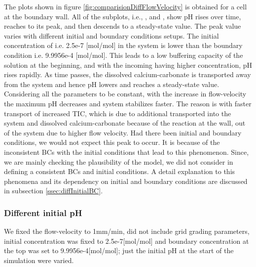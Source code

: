 The plots shown in figure \ref{fig:comparisionDiffFlowVelocity} is obtained for a cell at the boundary wall. 
All of the subplots, i.e., ,  and , 
show pH rises over time, reaches to its peak, and then descends to a steady-state value. The peak value 
varies with different initial and boundary conditions setups. 
The initial concentration of  i.e. 2.5e-7 [mol/mol] in the system is lower than the 
boundary condition i.e. 9.9956e-4 [mol/mol]. This leads to a low buffering capacity of the solution at the 
beginning, and with the incoming  having higher concentration, pH rises rapidly. As time passes, 
the dissolved calcium-carbonate is transported away from the system and hence pH lowers and reaches a steady-state value.\\
Considering all the parameters to be constant, with the increase in flow-velocity the maximum pH decreases and system stabilizes faster. 
The reason is with faster transport of increased TIC, which is due to additional  transported into the system and 
dissolved calcium-carbonate because of the reaction at the wall, out of the system due to higher flow velocity. 
Had there been initial and boundary conditions, we would not expect this peak to occur. It is because of the inconsistent 
BCs with the initial conditions that lead to this phenomenon. Since, we are mainly checking the plausibility of the model, 
we did not consider in defining a consistent BCs and initial conditions. A detail explanation to this phenomena and its dependency 
on initial and boundary conditions are discussed in subsection \ref{ssec:diffInitialBC}.


\subsubsection*{Different initial pH} \label{ssec:diffpH}
We fixed the flow-velocity to 1mm/min, did not include grid grading parameters, initial  concentration was fixed to 2.5e-7[mol/mol] and boundary concentration at the top was set to 9.9956e-4[mol/mol]; just the initial pH at the start of the simulation were varied.

